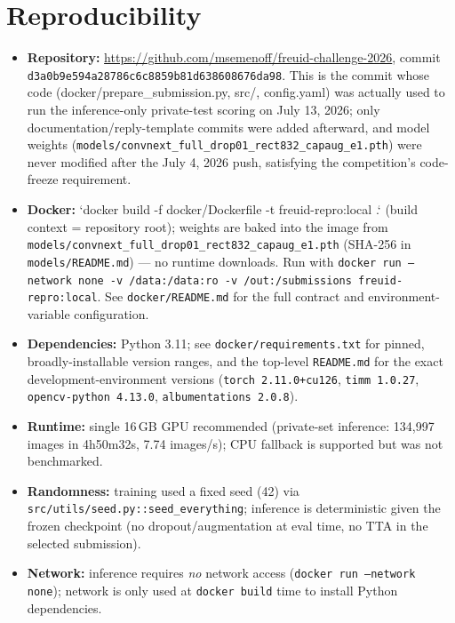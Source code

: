 \documentclass[11pt,a4paper]{article}
\begin{document}
\section{Reproducibility}
\label{sec:repro}
\begin{itemize}[noitemsep]
  \item \textbf{Repository:} \url{https://github.com/msemenoff/freuid-challenge-2026},
  commit \texttt{d3a0b9e594a28786c6c8859b81d638608676da98}. This is the
  commit whose code (docker/prepare\_submission.py, src/, config.yaml) was
  actually used to run the inference-only private-test scoring on July 13,
  2026; only documentation/reply-template commits were added afterward, and
  model weights (\texttt{models/convnext\_full\_drop01\_rect832\_capaug\_e1.pth})
  were never modified after the July 4, 2026 push, satisfying the
  competition's code-freeze requirement.
  \item \textbf{Docker:} `docker build -f docker/Dockerfile -t freuid-repro:local .`
  (build context = repository root); weights are baked into the image from
  \texttt{models/convnext\_full\_drop01\_rect832\_capaug\_e1.pth} (SHA-256 in
  \texttt{models/README.md}) — no runtime downloads. Run with
  \texttt{docker run --network none -v /data:/data:ro -v
  /out:/submissions freuid-repro:local}. See \texttt{docker/README.md} for
  the full contract and environment-variable configuration.
  \item \textbf{Dependencies:} Python 3.11; see \texttt{docker/requirements.txt}
  for pinned, broadly-installable version ranges, and the top-level
  \texttt{README.md} for the exact development-environment versions
  (\texttt{torch 2.11.0+cu126}, \texttt{timm 1.0.27}, \texttt{opencv-python
  4.13.0}, \texttt{albumentations 2.0.8}).
  \item \textbf{Runtime:} single 16\,GB GPU recommended (private-set
  inference: 134{,}997 images in 4h50m32s, 7.74 images/s); CPU fallback is
  supported but was not benchmarked.
  \item \textbf{Randomness:} training used a fixed seed (42) via
  \texttt{src/utils/seed.py::seed\_everything}; inference is deterministic
  given the frozen checkpoint (no dropout/augmentation at eval time, no TTA
  in the selected submission).
  \item \textbf{Network:} inference requires \emph{no} network access
  (\texttt{docker run --network none}); network is only used at
  \texttt{docker build} time to install Python dependencies.
\end{itemize}
\end{document}
